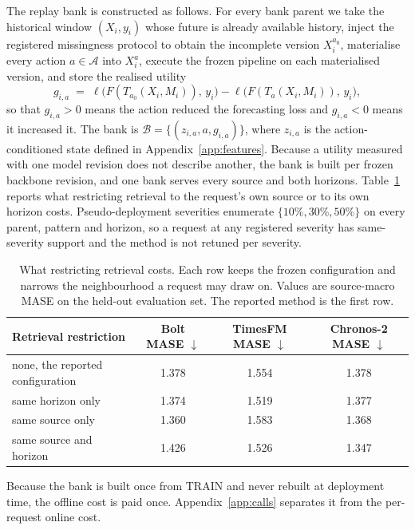 \documentclass{article}
\newcommand{\calA}{\mathcal{A}}
\newcommand{\calB}{\mathcal{B}}
\newcommand{\loss}{\ell}
\begin{document}
The replay bank is constructed as follows. For every bank parent we take the historical
window $(X_i, y_i)$ whose future is already available history, inject the registered
missingness protocol to obtain the incomplete version $X_i^{a_0}$, materialise every action
$a \in \calA$ into $X_i^{a}$, execute the frozen pipeline on each materialised version, and
store the realised utility
\begin{equation}
  g_{i,a} \;=\; \loss\big(F(T_{a_0}(X_i, M_i)),\, y_i\big) - \loss\big(F(T_{a}(X_i, M_i)),\, y_i\big),
  \label{eq:app-gain}
\end{equation}
so that $g_{i,a} > 0$ means the action reduced the forecasting loss and $g_{i,a} < 0$ means it
increased it. The bank is
$\calB = \{(z_{i,a}, a, g_{i,a})\}$, where $z_{i,a}$ is the action-conditioned state defined
in Appendix~\ref{app:features}. Because a utility measured with one model revision does not describe another, the bank is
built per frozen backbone revision, and one bank serves every source and both horizons.
Table~\ref{tab:app-retrieval} reports what restricting retrieval to the request's own source
or to its own horizon costs. Pseudo-deployment severities enumerate
$\{10\%, 30\%, 50\%\}$ on every parent, pattern and horizon, so a request at any registered
severity has same-severity support and the method is not retuned per severity.

\begin{table}[h]
  \caption{What restricting retrieval costs. Each row keeps the frozen configuration and
  narrows the neighbourhood a request may draw on. Values are source-macro MASE on the
  held-out evaluation set. The reported method is the first row.}
  \label{tab:app-retrieval}
  \centering
  \small
  \setlength{\tabcolsep}{4pt}
\begin{tabular}{lccc}
    \toprule
    Retrieval restriction & Bolt MASE $\downarrow$ & TimesFM MASE $\downarrow$ & Chronos-2 MASE $\downarrow$ \\
    \midrule
    none, the reported configuration & 1.378 & 1.554 & 1.378 \\
    same horizon only                & 1.374   & 1.519   & 1.377 \\
    same source only                 & 1.360  & 1.583  & 1.368 \\
    same source and horizon          & 1.426 & 1.526 & 1.347 \\
    \bottomrule
  \end{tabular}
\end{table}
Because the bank is built once from TRAIN and never rebuilt at deployment time, the offline
cost is paid once. Appendix~\ref{app:calls} separates it from the per-request online cost.
\end{document}
